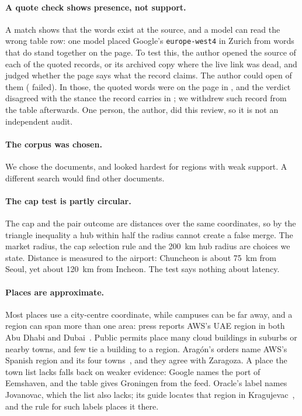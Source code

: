 \documentclass[10pt,twocolumn]{article}
\newcommand{\code}[1]{\texttt{#1}}
\begin{document}
\paragraph{A quote check shows presence, not support.} A match shows that the words exist at the source, and a model can read the wrong table row: one model placed Google's \code{europe-west4} in Zurich from words that do stand together on the page. To test this, the author opened the source of each of the \reviewRecords{} quoted records, or its archived copy where the live link was dead, and judged whether the page says what the record claims. The author could open \reviewOpened{} of them (\reviewCannotOpen{} failed). In those, the quoted words were on the page in \reviewOnPage{}, and the verdict disagreed with the stance the record carries in \reviewDisagree{}; we withdrew \reviewWithdrawn{} such record from the table afterwards. One person, the author, did this review, so it is not an independent audit.

\paragraph{The corpus was chosen.} We chose the documents, and looked hardest for regions with weak support. A different search would find other documents.

\paragraph{The cap test is partly circular.} The cap and the pair outcome are distances over the same coordinates, so by the triangle inequality a hub within half the radius cannot create a false merge. The market radius, the cap selection rule and the 200~km hub radius are choices we state. Distance is measured to the airport: Chuncheon is about 75~km from Seoul, yet about 120~km from Incheon. The test says nothing about latency.

\paragraph{Places are approximate.} Most places use a city-centre coordinate, while campuses can be far away, and a region can span more than one area: press reports AWS's UAE region in both Abu Dhabi and Dubai~\citep{meed_aws_uae}. Public permits place many cloud buildings in suburbs or nearby towns, and few tie a building to a region. Aragón's orders name AWS's Spanish region and its four towns~\citep{boa_aws_2026a,boa_aws_2026b}, and they agree with Zaragoza. A place the town list lacks falls back on weaker evidence: Google names the port of Eemshaven, and the table gives Groningen from the feed. Oracle's label names Jovanovac, which the list also lacks; its guide locates that region in Kragujevac~\citep{oracle_serbia_realm}, and the rule for such labels places it there.
\end{document}
